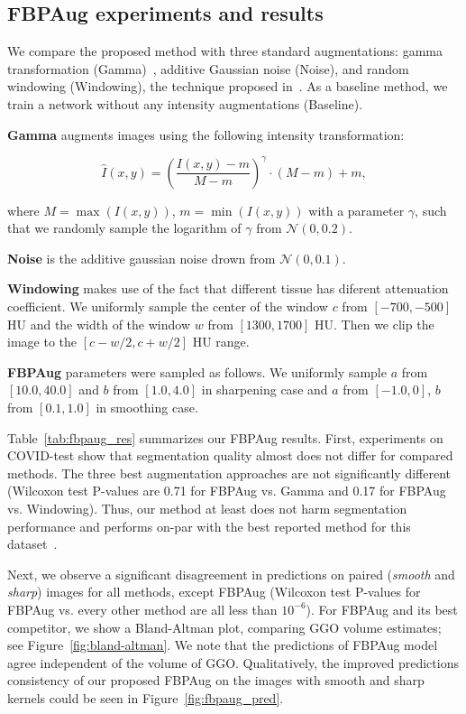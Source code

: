 

\subsection{FBPAug experiments and results}

We compare the proposed method with three standard augmentations: gamma transformation (Gamma)~\cite{gamma_example}, additive Gaussian noise (Noise), and random windowing (Windowing), the technique proposed in~\cite{kloenne2020domain}. As a baseline method, we train a network without any intensity augmentations (Baseline).

\textbf{Gamma} augments images using the following intensity transformation:

\[
	\hat{I}(x, y) = \left(\frac{I(x, y) - m}{M - m}\right)^\gamma \cdot(M - m) + m,
\]

\noindent
where $M = \max(I(x, y))$, $m=\min(I(x, y))$ with a parameter $\gamma$, such that we randomly sample the logarithm of $\gamma$ from $\mathcal{N}(0, 0.2)$. 

\textbf{Noise} is the additive gaussian noise drown from $\mathcal{N}(0, 0.1)$. 

\textbf{Windowing}  makes use of the fact that different tissue has diferent attenuation coefficient. We uniformly sample the center of the window $c$ from $[-700, -500]$ HU  and the width of the window $w$ from $[1300, 1700]$ HU. Then we clip the image to the $[c - w/2, c + w/2]$ HU range.

\textbf{FBPAug} parameters were sampled as follows. We uniformly sample $a$ from $[10.0, 40.0]$ and  $b$ from $[1.0, 4.0]$ in sharpening case and $a$ from $[-1.0, 0]$, $b$ from $[0.1, 1.0]$ in smoothing case.

Table~\ref{tab:fbpaug_res} summarizes our FBPAug results. First, experiments on COVID-test show that segmentation quality almost does not differ for compared methods. The three best augmentation approaches are not significantly different (Wilcoxon test P-values are 0.71 for FBPAug vs. Gamma and 0.17 for FBPAug vs. Windowing). Thus, our method at least does not harm segmentation performance and performs on-par with the best reported method for this dataset~\cite{goncharov2021ct}.



Next, we observe a significant disagreement in predictions on paired (\textit{smooth} and \textit{sharp}) images for all methods, except FBPAug (Wilcoxon test P-values for FBPAug vs. every other method are all less than $10^{-6}$). For FBPAug and its best competitor, we show a Bland-Altman plot, comparing GGO volume estimates; see Figure~\ref{fig:bland-altman}. We note that the predictions of FBPAug model agree independent of the volume of GGO. Qualitatively, the improved predictions consistency of our proposed FBPAug on the images with smooth and sharp kernels could be seen in Figure~\ref{fig:fbpaug_pred}.

